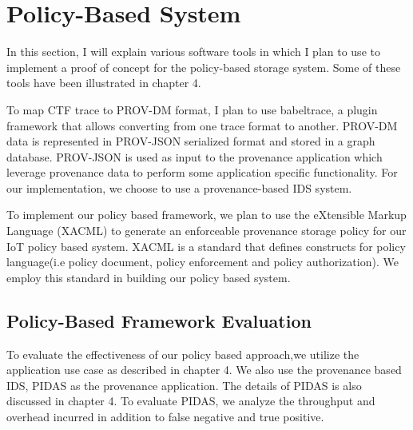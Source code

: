 \section{Policy-Based System}

In this section, I will explain various software tools in which I plan to use to implement a proof of concept for the policy-based storage system. Some of these tools have been illustrated in chapter 4. 


\par To map CTF trace to PROV-DM format, I plan to use babeltrace, a plugin framework that allows converting from one trace format to another. PROV-DM data is represented in PROV-JSON serialized format and stored in a graph database. PROV-JSON is used as input to the provenance application which leverage provenance data to perform some application specific functionality. For our implementation, we choose to use a provenance-based IDS system.


To implement our policy based framework, we plan to use the eXtensible Markup Language (XACML)  \cite{xacml} to generate an enforceable provenance storage policy for our IoT policy based system. XACML is a standard that defines constructs for policy language(i.e policy document, policy enforcement and policy authorization). We employ this standard in building our policy based system.


\subsection{Policy-Based Framework Evaluation}

To evaluate the effectiveness of our policy based approach,we utilize the application use case as described in chapter 4. We also use the provenance based IDS, PIDAS as the provenance application. The details of PIDAS is also discussed in chapter 4. To evaluate PIDAS, we analyze the throughput and overhead incurred in addition to false negative and true positive.







